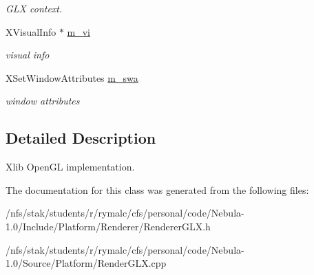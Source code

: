 \begin{DoxyCompactItemize}
\begin{DoxyCompactList}\small\item\em GLX context. \item\end{DoxyCompactList}\item 
\hypertarget{classPlatform_1_1RenderGLX_a49865a95899223f4f02ce89b9643af28}{
XVisualInfo $\ast$ \hyperlink{classPlatform_1_1RenderGLX_a49865a95899223f4f02ce89b9643af28}{m\_\-vi}}
\label{classPlatform_1_1RenderGLX_a49865a95899223f4f02ce89b9643af28}

\begin{DoxyCompactList}\small\item\em visual info \item\end{DoxyCompactList}\item 
\hypertarget{classPlatform_1_1RenderGLX_ad7a318fe5da5f0bd7e7a3b58edd9d698}{
XSetWindowAttributes \hyperlink{classPlatform_1_1RenderGLX_ad7a318fe5da5f0bd7e7a3b58edd9d698}{m\_\-swa}}
\label{classPlatform_1_1RenderGLX_ad7a318fe5da5f0bd7e7a3b58edd9d698}

\begin{DoxyCompactList}\small\item\em window attributes \item\end{DoxyCompactList}\end{DoxyCompactItemize}


\subsection{Detailed Description}
Xlib OpenGL implementation. 

The documentation for this class was generated from the following files:\begin{DoxyCompactItemize}
\item 
/nfs/stak/students/r/rymalc/cfs/personal/code/Nebula-\/1.0/Include/Platform/Renderer/RendererGLX.h\item 
/nfs/stak/students/r/rymalc/cfs/personal/code/Nebula-\/1.0/Source/Platform/RenderGLX.cpp\end{DoxyCompactItemize}
